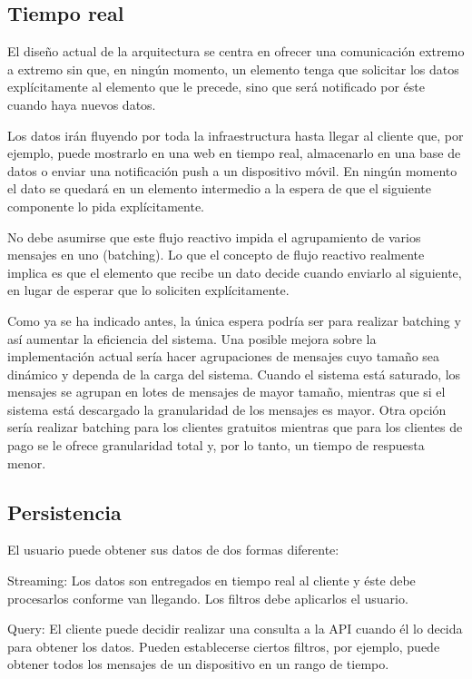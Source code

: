 \subsection{Tiempo real}

El diseño actual de la arquitectura se centra en ofrecer una comunicación
extremo a extremo sin que, en ningún momento, un elemento tenga que solicitar
los datos explícitamente al elemento que le precede, sino que será notificado
por éste cuando haya nuevos datos.

Los datos irán fluyendo por toda la infraestructura hasta llegar al cliente que,
por ejemplo, puede mostrarlo en una web en tiempo real, almacenarlo en una base
de datos o enviar una notificación push a un dispositivo móvil. En ningún
momento el dato se quedará en un elemento intermedio a la espera de que el
siguiente componente lo pida explícitamente.

No debe asumirse que este flujo reactivo impida el agrupamiento de varios
mensajes en uno (batching). Lo que el concepto de flujo reactivo realmente
implica es que el elemento que recibe un dato decide cuando enviarlo al
siguiente, en lugar de esperar que lo soliciten explícitamente.

Como ya se ha indicado antes, la única espera podría ser para realizar batching
y así aumentar la eficiencia del sistema. Una posible mejora sobre la
implementación actual sería hacer agrupaciones de mensajes cuyo tamaño sea
dinámico y dependa de la carga del sistema. Cuando el sistema está saturado, los
mensajes se agrupan en lotes de mensajes de mayor tamaño, mientras que si el
sistema está descargado la granularidad de los mensajes es mayor. Otra opción
sería realizar batching para los clientes gratuitos mientras que para los
clientes de pago se le ofrece granularidad total y, por lo tanto, un tiempo de
respuesta menor.

\subsection{Persistencia}

El usuario puede obtener sus datos de dos formas diferente:

Streaming: Los datos son entregados en tiempo real al cliente y éste debe
procesarlos conforme van llegando. Los filtros debe aplicarlos el usuario.

Query: El cliente puede decidir realizar una consulta a la API cuando él lo
decida para obtener los datos. Pueden establecerse ciertos filtros, por ejemplo,
puede obtener todos los mensajes de un dispositivo en un rango de tiempo.

